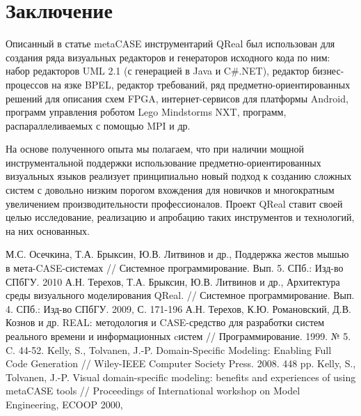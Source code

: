 \documentclass[a4paper]{article}
\begin{document}
\section*{Заключение}

Описанный в статье metaCASE инструментарий QReal был использован для создания ряда визуальных редакторов и генераторов исходного кода по ним: набор редакторов UML 2.1 (с генерацией в Java и C\#.NET), редактор бизнес-процессов на язке BPEL, редактор требований, ряд предметно-ориентированных решений для описания схем FPGA, интернет-сервисов для платформы Android, программ управления роботом Lego Mindstorms NXT, программ, распараллеливаемых с помощью MPI и др.

На основе полученного опыта мы полагаем, что при наличии мощной инструментальной поддержки использование предметно-ориентированных визуальных языков реализует принципиально новый подход к созданию сложных систем с довольно низким порогом вхождения для новичков и многократным увеличением производительности профессионалов. Проект QReal ставит своей целью исследование, реализацию и апробацию таких инструментов и технологий, на них основанных.

\begin{thebibliography}{9001}
   М.С. Осечкина, Т.А. Брыксин, Ю.В. Литвинов и др., Поддержка жестов мышью в мета-CASE-системах  // Системное программирование. Вып. 5. СПб.: Изд-во СПбГУ. 2010
   А.Н. Терехов, Т.А. Брыксин, Ю.В. Литвинов и др., Архитектура среды визуального моделирования QReal. // Системное программирование. Вып. 4. СПб.: Изд-во СПбГУ. 2009, С. 171-196
   А.Н. Терехов, К.Ю. Романовский, Д.В. Кознов и др. REAL: методология и CASE-средство для разработки систем реального времени и информационных cистем // Программирование. 1999. № 5. C. 44-52.
   Kelly, S., Tolvanen, J.-P. Domain-Specific Modeling: Enabling Full Code Generation // Wiley-IEEE Computer Society Press. 2008. 448 pp.
   Kelly, S., Tolvanen, J.-P. Visual domain-specific modeling: benefits and experiences of using metaCASE tools // Proceedings of International workshop on Model Engineering, ECOOP 2000, 
\end{thebibliography}
\end{document}
